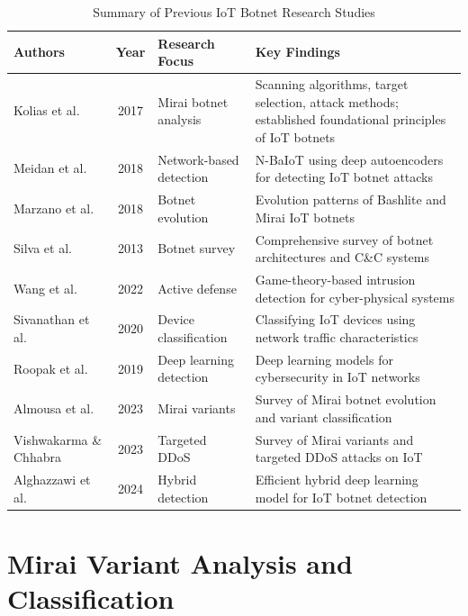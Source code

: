 \documentclass[12pt,letterpaper]{report}
\begin{document}
\begin{table}[htbp]
    \centering
    \caption{Summary of Previous IoT Botnet Research Studies}
    \label{tab:previous_studies}
    \begin{tabular}{|p{3.5cm}|c|p{4cm}|p{5cm}|}
        \hline
        \textbf{Authors} & \textbf{Year} & \textbf{Research Focus} & \textbf{Key Findings} \\
        \hline
        Kolias et al. & 2017 & Mirai botnet analysis & Scanning algorithms, target selection, attack methods; established foundational principles of IoT botnets \\
        \hline
        Meidan et al. & 2018 & Network-based detection & N-BaIoT using deep autoencoders for detecting IoT botnet attacks \\
        \hline
        Marzano et al. & 2018 & Botnet evolution & Evolution patterns of Bashlite and Mirai IoT botnets \\
        \hline
        Silva et al. & 2013 & Botnet survey & Comprehensive survey of botnet architectures and C\&C systems \\
        \hline
        Wang et al. & 2022 & Active defense & Game-theory-based intrusion detection for cyber-physical systems \\
        \hline
        Sivanathan et al. & 2020 & Device classification & Classifying IoT devices using network traffic characteristics \\
        \hline
        Roopak et al. & 2019 & Deep learning detection & Deep learning models for cybersecurity in IoT networks \\
        \hline
        Almousa et al. & 2023 & Mirai variants & Survey of Mirai botnet evolution and variant classification \\
        \hline
        Vishwakarma \& Chhabra & 2023 & Targeted DDoS & Survey of Mirai variants and targeted DDoS attacks on IoT \\
        \hline
        Alghazzawi et al. & 2024 & Hybrid detection & Efficient hybrid deep learning model for IoT botnet detection \\
        \hline
    \end{tabular}
\end{table}

\section{Mirai Variant Analysis and Classification}
\end{document}
